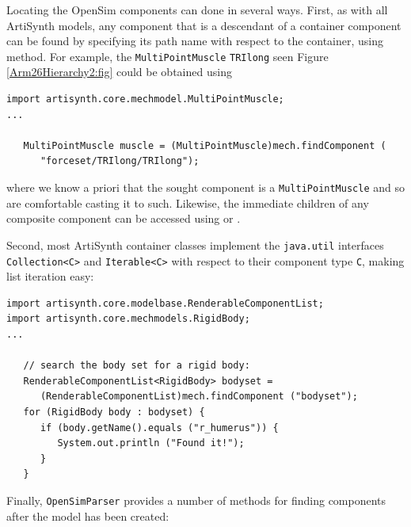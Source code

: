 Locating the OpenSim components can done in several ways.  First, as with all
ArtiSynth models, any component that is a descendant of a container component
can be found by specifying its path name with respect to the container, using
 method. For example,
the {\tt MultiPointMuscle} {\tt TRIlong} seen Figure \ref{Arm26Hierarchy2:fig}
could be obtained using
%
\begin{lstlisting}[]
import artisynth.core.mechmodel.MultiPointMuscle;
...

   MultiPointMuscle muscle = (MultiPointMuscle)mech.findComponent (
      "forceset/TRIlong/TRIlong");
\end{lstlisting}
%
where we know a priori that the sought component is a {\tt MultiPointMuscle} and
so are comfortable casting it to such. Likewise, the immediate children
of any composite component can be accessed using 
 or
.

Second, most ArtiSynth container classes implement the {\tt java.util}
interfaces {\tt Collection<C>} and {\tt Iterable<C>} with respect to their
component type {\tt C}, making list iteration easy:
%
\begin{lstlisting}[]
import artisynth.core.modelbase.RenderableComponentList;
import artisynth.core.mechmodels.RigidBody;
...

   // search the body set for a rigid body:
   RenderableComponentList<RigidBody> bodyset =
      (RenderableComponentList)mech.findComponent ("bodyset");
   for (RigidBody body : bodyset) {
      if (body.getName().equals ("r_humerus")) {
         System.out.println ("Found it!");
      }
   }
\end{lstlisting}
%
Finally, {\tt OpenSimParser} provides a number of methods for finding
components after the model has been created:

